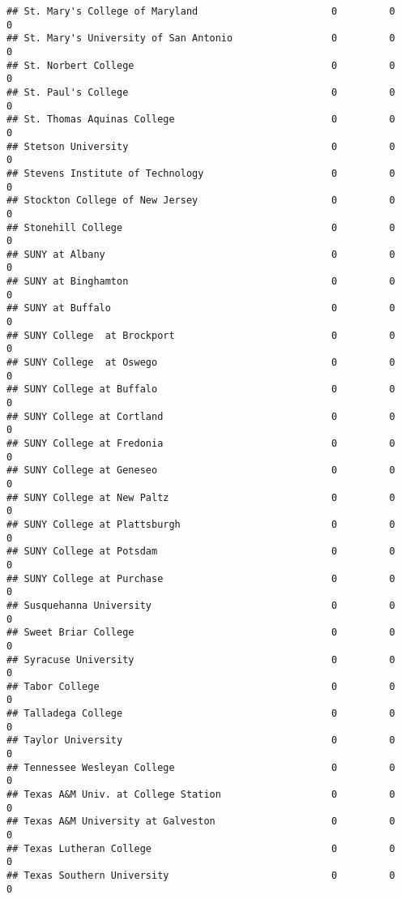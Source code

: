 \documentclass[
]{article}
\begin{document}
\begin{verbatim}
## St. Mary's College of Maryland                       0         0           0
## St. Mary's University of San Antonio                 0         0           0
## St. Norbert College                                  0         0           0
## St. Paul's College                                   0         0           0
## St. Thomas Aquinas College                           0         0           0
## Stetson University                                   0         0           0
## Stevens Institute of Technology                      0         0           0
## Stockton College of New Jersey                       0         0           0
## Stonehill College                                    0         0           0
## SUNY at Albany                                       0         0           0
## SUNY at Binghamton                                   0         0           0
## SUNY at Buffalo                                      0         0           0
## SUNY College  at Brockport                           0         0           0
## SUNY College  at Oswego                              0         0           0
## SUNY College at Buffalo                              0         0           0
## SUNY College at Cortland                             0         0           0
## SUNY College at Fredonia                             0         0           0
## SUNY College at Geneseo                              0         0           0
## SUNY College at New Paltz                            0         0           0
## SUNY College at Plattsburgh                          0         0           0
## SUNY College at Potsdam                              0         0           0
## SUNY College at Purchase                             0         0           0
## Susquehanna University                               0         0           0
## Sweet Briar College                                  0         0           0
## Syracuse University                                  0         0           0
## Tabor College                                        0         0           0
## Talladega College                                    0         0           0
## Taylor University                                    0         0           0
## Tennessee Wesleyan College                           0         0           0
## Texas A&M Univ. at College Station                   0         0           0
## Texas A&M University at Galveston                    0         0           0
## Texas Lutheran College                               0         0           0
## Texas Southern University                            0         0           0

\end{verbatim}
\end{document}
